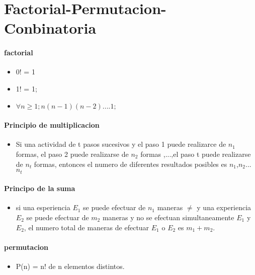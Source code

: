 \documentclass[a4paper]{article}
\begin{document}
\section{Factorial-Permutacion-Conbinatoria}

\paragraph{factorial}
	\begin{itemize}
		\item 0! = 1\\
		 
		\item 1! = 1;\\
		\item $\forall n \geq 1; n(n-1)(n-2)....1;$
	\end{itemize}

\paragraph{Principio de multiplicacion}

\begin{itemize}
\item Si una actividad de t pasos sucesivos y el paso 1 puede realizarce de $n_1$ formas, el paso 2 puede realizarse de $n_2$ formas ,...,el paso t puede realizarse de $n_t$ formas,	entonces el numero de diferentes resultados posibles es	$n_1$,$n_2$...$n_t$
\end{itemize}

\paragraph{Principo de la suma}
\begin{itemize}
	\item si una esperiencia $E_1$  se puede efectuar de $n_1$ maneras $\neq$ y una experiencia $E_2$ se puede efectuar de $m_2$ maneras y no se efectuan simultaneamente $E_1$ y $E_2$, el numero total de maneras de efectuar  $E_1$ o $E_2$ es $m_1 + m_2$.
\end{itemize}

\paragraph{permutacion}
\begin{itemize}
	\item P(n) = n! de n elementos distintos.
\end{itemize}
\end{document}
